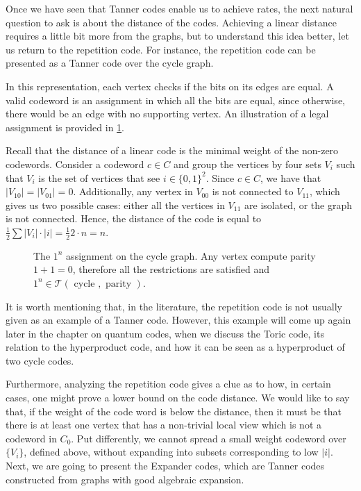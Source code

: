  Once we have seen that Tanner codes enable us to achieve rates, the next natural question to ask is about the distance of the codes. Achieving a linear distance requires a little bit more from the graphs, but to understand this idea better, let us return to the repetition code. For instance, the repetition code can be presented as a Tanner code over the cycle graph.  

  \begin{example}
    In this representation, each vertex checks if the bits on its edges are equal. A valid codeword is an assignment in which all the bits are equal, since otherwise, there would be an edge with no supporting vertex. An illustration of a legal assignment is provided in \cref{fig:cyc}.
    

Recall that the distance of a linear code is the minimal weight of the non-zero codewords. Consider a codeword $c \in C$ and group the vertices by four sets $V_i$ such that $V_i$ is the set of vertices that see $i \in \{0,1\}^{2}$. Since $c \in C$, we have that $|V_{10}|=|V_{01}| = 0$. Additionally, any vertex in $V_{00}$ is not connected to $V_{11}$, which gives us two possible cases: either all the vertices in $V_{11}$ are isolated, or the graph is not connected. Hence, the distance of the code is equal to $\frac{1}{2}\sum{|V_{i}|\cdot |i|} = \frac{1}{2}2 \cdot n = n$.
  \end{example} 


 \begin{figure}[h]
   \begin{center}
  \label{fig:cyc}
 
\caption{The $1^{n}$ assignment on the cycle graph. Any vertex compute parity $1 + 1 = 0$, therefore all the restrictions are satisfied and $1^n \in \mathcal{T} \left( \text{ cycle } , \text{ parity }  \right) $.}
\end{center}
\end{figure}

It is worth mentioning that, in the literature, the repetition code is not usually given as an example of a Tanner code. However, this example will come up again later in the chapter on quantum codes, when we discuss the Toric code, its relation to the hyperproduct code, and how it can be seen as a hyperproduct of two cycle codes.

Furthermore, analyzing the repetition code gives a clue as to how, in certain cases, one might prove a lower bound on the code distance. We would like to say that, if the weight of the code word is below the distance, then it must be that there is at least one vertex that has a non-trivial local view which is not a codeword in $C_{0}$. Put differently, we cannot spread a small weight codeword over $\{V_{i}\}$, defined above, without expanding into subsets corresponding to low $|i|$. Next, we are going to present the Expander codes, which are Tanner codes constructed from graphs with good algebraic expansion.

